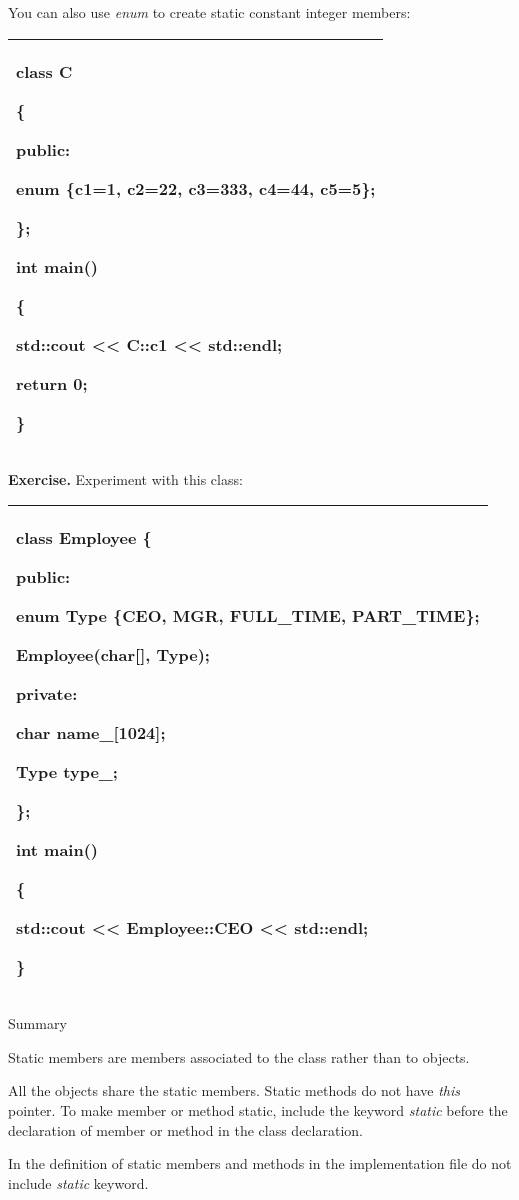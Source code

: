 \documentclass[
]{article}
\begin{document}
You can also use \emph{enum }to create static constant integer members:

\begin{longtable}[]{@{}l@{}}
\toprule
\endhead
\begin{minipage}[t]{0.97\columnwidth}\raggedright
class C

\{

public:

enum \{c1=1, c2=22, c3=333, c4=44, c5=5\};

\};

int main()

\{

std::cout \textless\textless{} C::c1 \textless\textless{} std::endl;

return 0;

\}\strut
\end{minipage}\tabularnewline
\bottomrule
\end{longtable}

\textbf{Exercise. }Experiment with this class:

\begin{longtable}[]{@{}l@{}}
\toprule
\endhead
\begin{minipage}[t]{0.97\columnwidth}\raggedright
class Employee \{

public:

enum Type \{CEO, MGR, FULL\_TIME, PART\_TIME\};

Employee(char{[}{]}, Type);

private:

char name\_{[}1024{]};

Type type\_;

\};

int main()

\{

std::cout \textless\textless{} Employee::CEO \textless\textless{}
std::endl;

\}\strut
\end{minipage}\tabularnewline
\bottomrule
\end{longtable}

Summary

Static members are members associated to the class rather than to
objects.

All the objects share the static members. Static methods do not have
\emph{this} pointer. To make member or method static, include the
keyword \emph{static} before the declaration of member or method in the
class declaration.

In the definition of static members and methods in the implementation
file do not include \emph{static} keyword.
\end{document}

